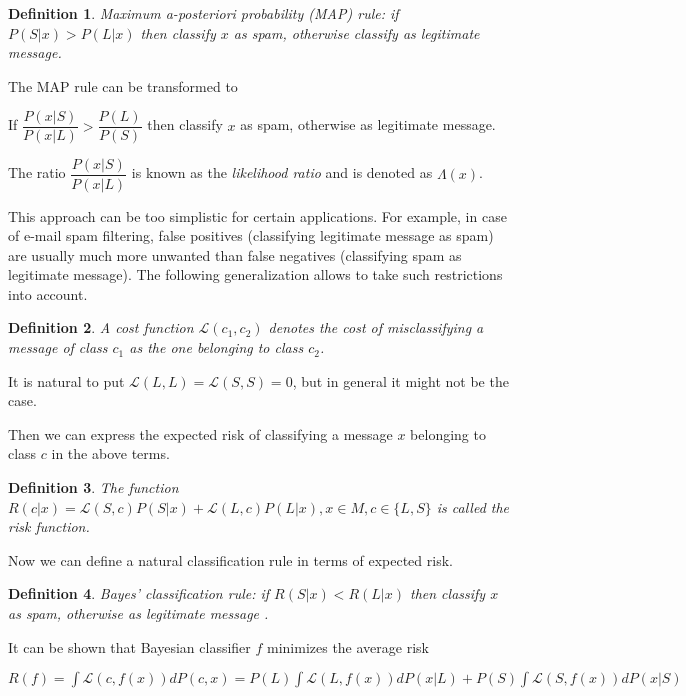 \documentclass[12pt]{report}
\newcommand{\Loss}{\mathcal{L}}
\newtheorem{definition}{Definition}[section]
\begin{document}
\begin{definition}
	Maximum a-posteriori probability (MAP) rule: if $P(S | x) > P(L | x)$ then classify $x$ as spam, otherwise classify as legitimate message.
\end{definition}

The MAP rule can be transformed to

\begin{center}
	If $\dfrac{P(x | S)}{P(x | L)} > \dfrac{P(L)}{P(S)}$ then classify $x$ as spam, otherwise as legitimate message.
\end{center}

The ratio $\dfrac{P(x | S)}{P(x | L)}$ is known as the \textit{likelihood ratio} and is denoted as $\Lambda(x)$.

This approach can be too simplistic for certain applications. For example, in case of e-mail spam filtering, false positives (classifying legitimate message as spam) are usually much more unwanted than false negatives (classifying spam as legitimate message). The following generalization allows to take such restrictions into account.

\begin{definition}
	A cost function $\Loss(c_1, c_2)$ denotes the cost of misclassifying a message of class $c_1$ as the one belonging to class $c_2$.
\end{definition}

It is natural to put $\Loss(L, L) = \Loss(S, S) = 0$, but in general it might not be the case.

Then we can express the expected risk of classifying a message $x$ belonging to class $c$ in the above terms.

\begin{definition}
	The function $R(c | x) = \Loss(S, c) P(S |x) + \Loss(L, c) P(L | x), x \in M, c \in \{L, S\}$ is called the risk function.
\end{definition}

Now we can define a natural classification rule in terms of expected risk.

\begin{definition}
	Bayes' classification rule: if $R(S | x) < R(L | x)$ then classify $x$ as spam, otherwise as legitimate message \cite{Kecman}.
\end{definition}

It can be shown that Bayesian classifier $f$ minimizes the average risk

\begin{center}
	$R(f) = \int \Loss(c, f(x)) dP(c, x) = P(L) \int \Loss(L, f(x))dP(x | L) + P(S) \int \Loss(S, f(x))dP(x | S)$
\end{center}
\end{document}
